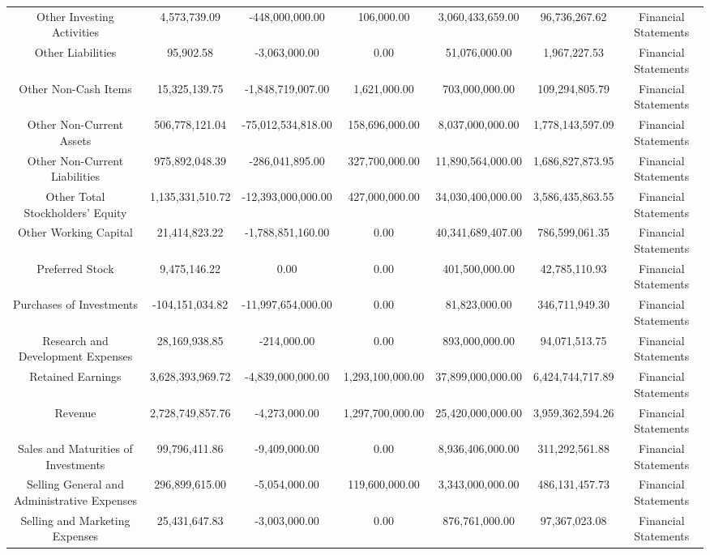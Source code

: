 \begin{longtable}{ccccccc}
Other Investing Activities & 4,573,739.09 & -448,000,000.00 & 106,000.00 & 3,060,433,659.00 & 96,736,267.62 & Financial Statements \\
Other Liabilities & 95,902.58 & -3,063,000.00 & 0.00 & 51,076,000.00 & 1,967,227.53 & Financial Statements \\
Other Non-Cash Items & 15,325,139.75 & -1,848,719,007.00 & 1,621,000.00 & 703,000,000.00 & 109,294,805.79 & Financial Statements \\
Other Non-Current Assets & 506,778,121.04 & -75,012,534,818.00 & 158,696,000.00 & 8,037,000,000.00 & 1,778,143,597.09 & Financial Statements \\
Other Non-Current Liabilities & 975,892,048.39 & -286,041,895.00 & 327,700,000.00 & 11,890,564,000.00 & 1,686,827,873.95 & Financial Statements \\
Other Total Stockholders' Equity & 1,135,331,510.72 & -12,393,000,000.00 & 427,000,000.00 & 34,030,400,000.00 & 3,586,435,863.55 & Financial Statements \\
Other Working Capital & 21,414,823.22 & -1,788,851,160.00 & 0.00 & 40,341,689,407.00 & 786,599,061.35 & Financial Statements \\
Preferred Stock & 9,475,146.22 & 0.00 & 0.00 & 401,500,000.00 & 42,785,110.93 & Financial Statements \\
Purchases of Investments & -104,151,034.82 & -11,997,654,000.00 & 0.00 & 81,823,000.00 & 346,711,949.30 & Financial Statements \\
Research and Development Expenses & 28,169,938.85 & -214,000.00 & 0.00 & 893,000,000.00 & 94,071,513.75 & Financial Statements \\
Retained Earnings & 3,628,393,969.72 & -4,839,000,000.00 & 1,293,100,000.00 & 37,899,000,000.00 & 6,424,744,717.89 & Financial Statements \\
Revenue & 2,728,749,857.76 & -4,273,000.00 & 1,297,700,000.00 & 25,420,000,000.00 & 3,959,362,594.26 & Financial Statements \\
Sales and Maturities of Investments & 99,796,411.86 & -9,409,000.00 & 0.00 & 8,936,406,000.00 & 311,292,561.88 & Financial Statements \\
Selling General and Administrative Expenses & 296,899,615.00 & -5,054,000.00 & 119,600,000.00 & 3,343,000,000.00 & 486,131,457.73 & Financial Statements \\
Selling and Marketing Expenses & 25,431,647.83 & -3,003,000.00 & 0.00 & 876,761,000.00 & 97,367,023.08 & Financial Statements \\

\end{longtable}
